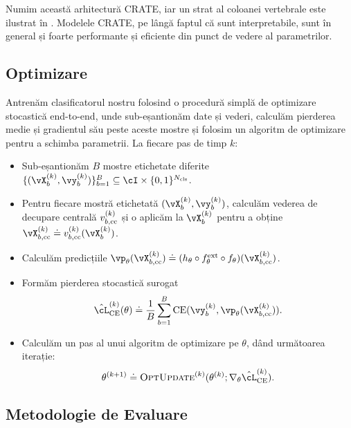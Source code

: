 \documentclass[../../book-main_ro.tex]{subfiles}
\begin{document}
Numim această arhitectură CRATE, iar un strat al coloanei vertebrale este ilustrat în . Modelele CRATE, pe lângă faptul că sunt interpretabile, sunt în general și foarte performante și eficiente din punct de vedere al parametrilor.

\subsection{Optimizare} \label{sub:image_classification_optimization}

Antrenăm clasificatorul nostru folosind o procedură simplă de optimizare stocastică end-to-end, unde sub-eșantionăm date și vederi, calculăm pierderea medie și gradientul său peste aceste mostre și folosim un algoritm de optimizare pentru a schimba parametrii. La fiecare pas de timp \(k\):
\begin{itemize}
    \item Sub-eșantionăm \(B\) mostre etichetate diferite \(\{(\vX_{b}^{(k)}, \vy_{b}^{(k)})\}_{b = 1}^{B} \subseteq \cI \times \{0, 1\}^{N_{\cls}}\).
    \item Pentru fiecare mostră etichetată \((\vX_{b}^{(k)}, \vy_{b}^{(k)})\), calculăm vederea de decupare centrală \(v_{b, \mathrm{cc}}^{(k)}\) și o aplicăm la \(\vX_{b}^{(k)}\) pentru a obține \(\vX_{b, \cc}^{(k)} \doteq v_{b, \cc}^{(k)}(\vX_{b}^{(k)})\).
    \item Calculăm predicțiile \(\vp_{\theta}(\vX_{b, \cc}^{(k)}) \doteq (h_{\theta} \circ f_{\theta}^{\ext} \circ f_{\theta})(\vX_{b, \cc}^{(k)})\).
    \item Formăm pierderea stocastică surogat 
    \begin{equation}
        \hat{\cL}_{\CE}^{(k)}(\theta) \doteq \frac{1}{B}\sum_{b = 1}^{B}\CE(\vy_{b}^{(k)}, \vp_{\theta}(\vX_{b, \cc}^{(k)})).
    \end{equation}
    \item Calculăm un pas al unui algoritm de optimizare pe \(\theta\), dând următoarea iterație:
    \begin{equation}
        \theta^{(k + 1)} \doteq \textsc{OptUpdate}^{(k)}(\theta^{(k)}; \nabla_{\theta}\hat{\cL}_{\CE}^{(k)}).
    \end{equation}
\end{itemize}


\subsection{Metodologie de Evaluare} \label{sub:image_classification_evals}
\end{document}
